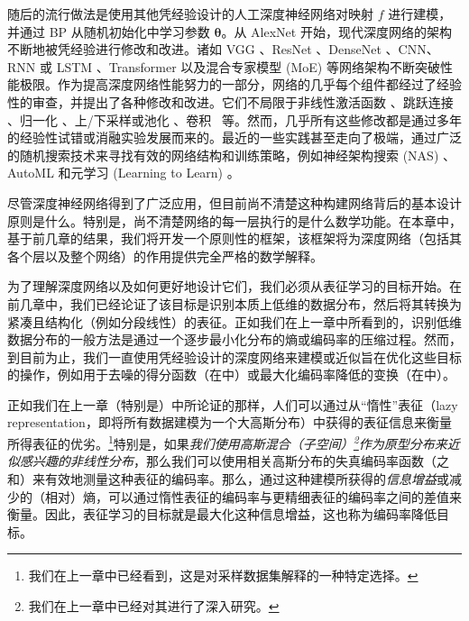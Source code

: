 \documentclass[../../book-main_zh.tex]{subfiles}
\begin{document}
随后的流行做法是使用其他凭经验设计的人工深度神经网络对映射 $f$ 进行建模，并通过 BP 从随机初始化中学习参数 $\bm \theta$。从 AlexNet \cite{krizhevsky2012imagenet} 开始，现代深度网络的架构不断地被凭经验进行修改和改进。诸如 VGG \cite{simonyan2014very}、ResNet \cite{he2016deep}、DenseNet \cite{dense-net}、CNN、RNN 或 LSTM \cite{LSTM}、Transformer \cite{vaswani2017attention} 以及混合专家模型 (MoE) \cite{MoE,Fedus-2022} 等网络架构不断突破性能极限。作为提高深度网络性能努力的一部分，网络的几乎每个组件都经过了经验性的审查，并提出了各种修改和改进。它们不局限于非线性激活函数 \cite{maas2013rectifier,klambauer2017self,xu2015empirical,nwankpa2018activation}、跳跃连接 \cite{ronneberger2015u,he2016deep}、归一化 \cite{ioffe2015batch,ba2016layer,ulyanov2016instance,wu2018group,miyato2018spectral}、上/下采样或池化 \cite{scherer2010evaluation}、卷积~\cite{lecun1998gradient,krizhevsky2012imagenet} 等。然而，几乎所有这些修改都是通过多年的经验性{试错}或消融实验发展而来的。最近的一些实践甚至走向了极端，通过广泛的随机搜索技术来寻找有效的网络结构和训练策略，例如神经架构搜索 (NAS) \cite{NAS-1,Baker2017DesigningNN}、AutoML \cite{automl} 和元学习 (Learning to Learn) \cite{andrychowicz2016learning}。

尽管深度神经网络得到了广泛应用，但目前尚不清楚这种构建网络背后的基本设计原则是什么。特别是，尚不清楚网络的每一层执行的是什么数学功能。在本章中，基于前几章的结果，我们将开发一个原则性的框架，该框架将为深度网络（包括其各个层以及整个网络）的作用提供完全严格的数学解释。

为了理解深度网络以及如何更好地设计它们，我们必须从表征学习的目标开始。在前几章中，我们已经论证了该目标是识别本质上低维的数据分布，然后将其转换为紧凑且结构化（例如分段线性）的表征。正如我们在上一章中所看到的，识别低维数据分布的一般方法是通过一个逐步最小化分布的熵或编码率的压缩过程。然而，到目前为止，我们一直使用凭经验设计的深度网络来建模或近似旨在优化这些目标的操作，例如用于去噪的得分函数（在中）或最大化编码率降低的变换（在中）。

正如我们在上一章（特别是）中所论证的那样，人们可以通过从“惰性”表征（lazy representation，即将所有数据建模为一个大高斯分布）中获得的表征信息来衡量所得表征的优劣。\footnote{我们在上一章中已经看到，这是对采样数据集解释的一种特定选择。}特别是，如果\textit{我们使用高斯混合（子空间）\footnote{我们在上一章中已经对其进行了深入研究。}作为原型分布来近似感兴趣的非线性分布}，那么我们可以使用相关高斯分布的失真编码率函数（之和）来有效地测量这种表征的编码率。那么，通过这种建模所获得的{\em 信息增益}或减少的（相对）熵，可以通过惰性表征的编码率与更精细表征的编码率之间的差值来衡量。因此，表征学习的目标就是最大化这种信息增益，这也称为编码率降低目标。
\end{document}
